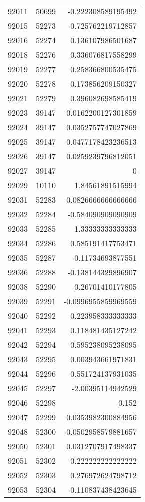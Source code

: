 \begin{tabular}{r | r | r}
92011 & 50699 & -0.222308589195492 \\
92015 & 52273 & -0.725762219712857 \\
92016 & 52274 & 0.136107986501687 \\
92018 & 52276 & 0.336076817558299 \\
92019 & 52277 & 0.258366800535475 \\
92020 & 52278 & 0.173856209150327 \\
92021 & 52279 & 0.396082698585419 \\
92023 & 39147 & 0.0162200127301859 \\
92024 & 39147 & 0.0352757747027869 \\
92025 & 39147 & 0.0477178423236513 \\
92026 & 39147 & 0.0259239796812051 \\
92027 & 39147 & 0 \\
92029 & 10110 & 1.84561891515994 \\
92031 & 52283 & 0.0826666666666666 \\
92032 & 52284 & -0.584090909090909 \\
92033 & 52285 & 1.33333333333333 \\
92034 & 52286 & 0.585191417753471 \\
92035 & 52287 & -0.11734693877551 \\
92036 & 52288 & -0.138144329896907 \\
92038 & 52290 & -0.26701410177805 \\
92039 & 52291 & -0.0996955859969559 \\
92040 & 52292 & 0.223958333333333 \\
92041 & 52293 & 0.118481435127242 \\
92042 & 52294 & -0.595238095238095 \\
92043 & 52295 & 0.003943661971831 \\
92044 & 52296 & 0.551724137931035 \\
92045 & 52297 & -2.00395114942529 \\
92046 & 52298 & -0.152 \\
92047 & 52299 & 0.0353982300884956 \\
92048 & 52300 & -0.0502958579881657 \\
92050 & 52301 & 0.0312707917498337 \\
92051 & 52302 & -0.222222222222222 \\
92052 & 52303 & 0.276972624798712 \\
92053 & 52304 & -0.110837438423645 \\

\end{tabular}

